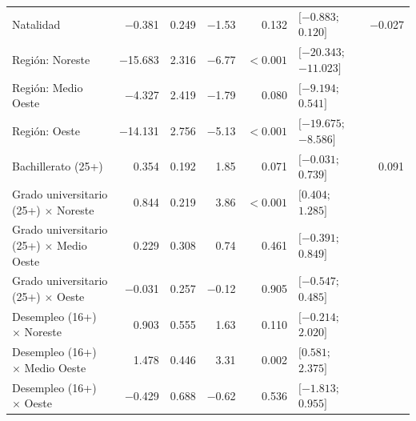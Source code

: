 {\begin{xltabular}{\linewidth}{>{\raggedright\arraybackslash}X r r r r l r}
Natalidad & \num{-0.381} & \num{0.249} & \num{-1.53} & \num{0.132} & $[\num{-0.883};$\allowbreak\ $\num{0.120}]$ & \num{-0.027} \\
Región: Noreste & \num{-15.683} & \num{2.316} & \num{-6.77} & $<\num{0.001}$ & $[\num{-20.343};$\allowbreak\ $\num{-11.023}]$ &  \\
Región: Medio Oeste & \num{-4.327} & \num{2.419} & \num{-1.79} & \num{0.080} & $[\num{-9.194};$\allowbreak\ $\num{0.541}]$ &  \\
Región: Oeste & \num{-14.131} & \num{2.756} & \num{-5.13} & $<\num{0.001}$ & $[\num{-19.675};$\allowbreak\ $\num{-8.586}]$ &  \\
Bachillerato (25+) & \num{0.354} & \num{0.192} & \num{1.85} & \num{0.071} & $[\num{-0.031};$\allowbreak\ $\num{0.739}]$ & \num{0.091} \\
Grado universitario (25+) $\times$ Noreste & \num{0.844} & \num{0.219} & \num{3.86} & $<\num{0.001}$ & $[\num{0.404};$\allowbreak\ $\num{1.285}]$ &  \\
Grado universitario (25+) $\times$ Medio Oeste & \num{0.229} & \num{0.308} & \num{0.74} & \num{0.461} & $[\num{-0.391};$\allowbreak\ $\num{0.849}]$ &  \\
Grado universitario (25+) $\times$ Oeste & \num{-0.031} & \num{0.257} & \num{-0.12} & \num{0.905} & $[\num{-0.547};$\allowbreak\ $\num{0.485}]$ &  \\
Desempleo (16+) $\times$ Noreste & \num{0.903} & \num{0.555} & \num{1.63} & \num{0.110} & $[\num{-0.214};$\allowbreak\ $\num{2.020}]$ &  \\
Desempleo (16+) $\times$ Medio Oeste & \num{1.478} & \num{0.446} & \num{3.31} & \num{0.002} & $[\num{0.581};$\allowbreak\ $\num{2.375}]$ &  \\
Desempleo (16+) $\times$ Oeste & \num{-0.429} & \num{0.688} & \num{-0.62} & \num{0.536} & $[\num{-1.813};$\allowbreak\ $\num{0.955}]$ &  \\
\end{xltabular}
}
